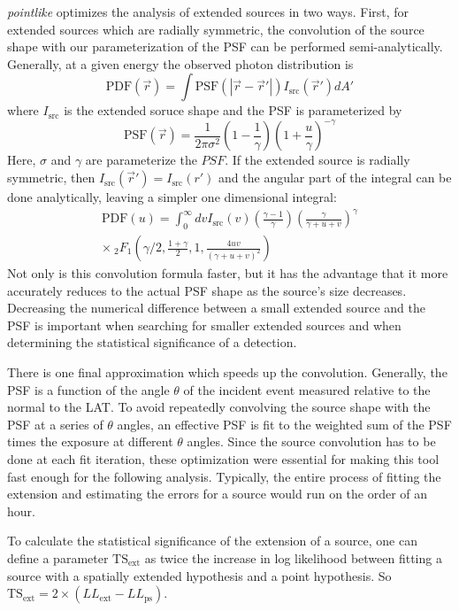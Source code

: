 \documentclass{emulateapj}
\begin{document}
{\em pointlike} optimizes the analysis of extended sources in two ways.
First, for extended sources which are radially symmetric, the convolution
of the source shape with our parameterization of the PSF can be performed
semi-analytically. Generally, at a given energy the observed 
photon distribution is
\begin{equation}
  \text{PDF}(\vec r) = \int  \text{PSF}(|\vec r - \vec r'|)I_\text{src}(\vec r') d A' 
\end{equation}
where $I_\text{src}$ is the extended soruce shape and the PSF is parameterized by
\begin{equation}
  \text{PSF}(\vec r) = 
  \frac{1}{2\pi\sigma^2}
  \left(1-\frac{1}{\gamma}\right)
  \left(1+\frac{u}{\gamma}\right)^{-\gamma}
\end{equation}
Here, $\sigma$ and $\gamma$ are parameterize the $PSF$.
If the extended source is radially symmetric, then
$I_\text{src} (\vec r') = I_\text{src} (r')$ and the angular part of the
integral can be done analytically, leaving a simpler one dimensional
integral:
\begin{multline}
  \text{PDF}(u)= \int_0^\infty dv
  I_\text{src}(v) 
  \left(\frac{\gamma-1}{\gamma}\right)
  \left( \frac{\gamma}{\gamma + u + v}\right)^\gamma \\
  \times ~_2F_1 \left(\gamma/2,\frac{1+\gamma}{2},1,\frac{4uv}{(\gamma+u+v)^2}\right)
\end{multline}
Not only is this convolution formula faster, but it has the advantage
that it more accurately reduces to the actual PSF shape as the source's
size decreases.  Decreasing the numerical difference between a small extended
source and the PSF is important when searching for smaller extended sources
and when determining the statistical significance of a detection.

There is one final approximation which speeds up the convolution.
Generally, the PSF is a function of the angle $\theta$ of the incident
event measured relative to the normal to the LAT. To avoid repeatedly
convolving the source shape with the PSF at a series of $\theta$ angles,
an effective PSF is fit to the weighted sum of the PSF times the exposure
at different $\theta$ angles.  Since the source convolution has to be
done at each fit iteration, these optimization were essential for making
this tool fast enough for the following analysis. Typically, the entire
process of fitting the extension and estimating the errors for a source
would run on the order of an hour.

To calculate the statistical significance of the extension of a source,
one can define a parameter $\text{TS}_\text{ext}$ as twice the increase
in log likelihood between fitting a source with a
spatially extended hypothesis and a point hypothesis. 
So $\text{TS}_\text{ext}=2\times(LL_\text{ext}-LL_\text{ps})$.
\end{document}
